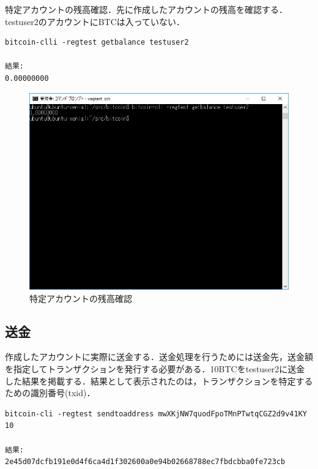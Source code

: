 特定アカウントの残高確認．先に作成したアカウントの残高を確認する．testuser2のアカウントにBTCは入っていない．
\begin{verbatim}
bitcoin-clli -regtest getbalance testuser2

結果:
0.00000000
\end{verbatim}

\newpage

\begin{figure}[h]
\centering
\includegraphics[width=12cm]{zandaka2.PNG}
\caption{特定アカウントの残高確認}\label{サンプル図}
\end{figure}



\newpage



\subsection{送金}
作成したアカウントに実際に送金する．送金処理を行うためには送金先，送金額を指定してトランザクションを発行する必要がある．10BTCをtestuser2に送金した結果を掲載する．結果として表示されたのは，トランザクションを特定するための識別番号(txid)．

\begin{verbatim}
bitcoin-cli -regtest sendtoaddress mwXKjNW7quodFpoTMnPTwtqCGZ2d9v41KY 10

結果:
2e45d07dcfb191e0d4f6ca4d1f302600a0e94b02668788ec7fbdcbba0fe723cb
\end{verbatim}

